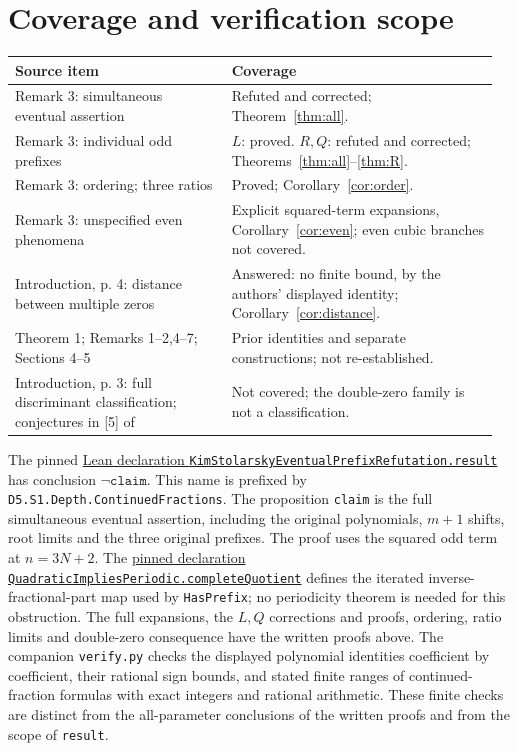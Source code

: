 \documentclass[11pt]{article}
\begin{document}
\section{Coverage and verification scope}
\begin{center}
\small
\begin{tabular}{@{}p{0.43\linewidth}p{0.53\linewidth}@{}}
\toprule
Source item & Coverage \\
\midrule
Remark 3: simultaneous eventual assertion & Refuted and corrected;
Theorem~\ref{thm:all}. \\
Remark 3: individual odd prefixes & $L$: proved. $R,Q$: refuted and
corrected; Theorems~\ref{thm:all}--\ref{thm:R}. \\
Remark 3: ordering; three ratios & Proved; Corollary~\ref{cor:order}. \\
Remark 3: unspecified even phenomena & Explicit squared-term expansions,
Corollary~\ref{cor:even}; even cubic branches not covered. \\
Introduction, p. 4: distance between multiple zeros & Answered: no finite
bound, by the authors' displayed identity; Corollary~\ref{cor:distance}. \\
Theorem 1; Remarks 1--2,4--7; Sections 4--5 & Prior identities and
separate constructions; not re-established. \\
Introduction, p. 3: full discriminant classification; conjectures in [5]
of~\cite{KS} & Not covered; the double-zero family is not a classification. \\
\bottomrule
\end{tabular}
\end{center}
The pinned
\href{https://github.com/the-omega-institute/trureturing/blob/53c631a19a8292b44b6ed47b8cb236f00c7f5ed8/D5/S1/Depth/ContinuedFractions/KimStolarskyEventualPrefixRefutation.lean}{Lean declaration \texttt{KimStolarskyEventualPrefixRefutation.result}}
has conclusion $\neg\texttt{claim}$. This name is prefixed by
\texttt{D5.S1.Depth.ContinuedFractions}.
The proposition \texttt{claim} is the full simultaneous eventual assertion,
including the original polynomials, $m+1$ shifts, root limits and the three
original prefixes. The proof uses the squared odd term at $n=3N+2$.
The
\href{https://github.com/the-omega-institute/trureturing/blob/53c631a19a8292b44b6ed47b8cb236f00c7f5ed8/D5/S1/Depth/ContinuedFractions/QuadraticImpliesPeriodic.lean}{pinned declaration \texttt{QuadraticImpliesPeriodic.completeQuotient}}
defines the iterated inverse-fractional-part map used by \texttt{HasPrefix};
no periodicity theorem is needed for this obstruction.
The full expansions, the $L,Q$ corrections and proofs, ordering, ratio
limits and double-zero consequence have the written proofs above.
The companion \texttt{verify.py} checks the displayed polynomial identities
coefficient by coefficient, their rational sign bounds, and stated finite
ranges of continued-fraction formulas with exact integers and rational
arithmetic. These finite checks are distinct from the all-parameter
conclusions of the written proofs and from the scope of \texttt{result}.
\end{document}
